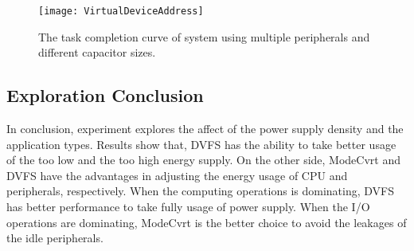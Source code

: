 \begin{figure}[!htpb]
	\centering
	\vspace{-5pt}
	\texttt{[image: VirtualDeviceAddress]}
	\vspace{-5pt}
	\caption{The task completion curve of system using multiple peripherals and different capacitor sizes.}	\label{fig:HotpotGraph}
\end{figure}

\subsection{Exploration Conclusion}	\label{sec:exp-sum}
%
In conclusion, experiment explores the affect of the power supply density and the application types. 
Results show that, DVFS has the ability to take better usage of the too low and the too high energy supply.
On the other side, ModeCvrt and DVFS have the advantages in adjusting the energy usage of CPU and peripherals, respectively.
When the computing operations is dominating, DVFS has better performance to take fully usage of power supply.
When the I/O operations are dominating, ModeCvrt is the better choice to avoid the leakages of the idle peripherals.

\begin{comment}

 
\end{comment}